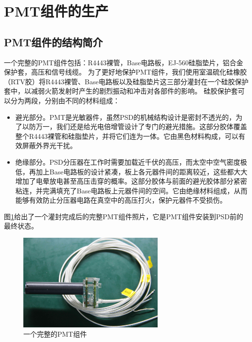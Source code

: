 \section{PMT组件的生产}
\label{sec:construction:pmt_production}

\subsection{PMT组件的结构简介}
\label{sec:construction:pmt_assembly}
一个完整的PMT组件包括：R4443裸管，Base电路板，EJ-560硅脂垫片，铝合金保护套，高压和信号线缆。
为了更好地保护PMT组件，我们使用室温硫化硅橡胶（RTV胶）将R4443裸管、Base电路板以及硅脂垫片这三部分灌封在一个硅胶保护套中，以减弱火箭发射时产生的剧烈振动和冲击对各部件的影响。
硅胶保护套可以分为两段，分别由不同的材料组成：
\begin{itemize}
	\item 避光部分。PMT是光敏器件，虽然PSD的机械结构设计是密封不透光的，为了以防万一，我们还是给光电倍增管设计了专门的避光措施。这部分胶体覆盖整个R4443裸管和硅脂垫片，并将它们连为一体。它由黑色材料构成，可以有效屏蔽外界光干扰。
	\item 绝缘部分。PSD分压器在工作时需要加载近千伏的高压，而太空中空气密度极低，再加上Base电路板的设计紧凑，板上各元器件间的距离较近，这些都大大增加了电晕放电甚至高压击穿的概率。这部分胶体与前面的避光胶体部分紧密粘连，并完满填充了Base电路板上元器件间的空间。它由绝缘材料组成，从而能够有效防止分压器电路在真空中的高压打火，保护元器件不受损伤。
\end{itemize}
图\ref{fig:construction:pmt_assembly}给出了一个灌封完成后的完整PMT组件照片，它是PMT组件安装到PSD前的最终状态。
\begin{figure}[htbp]
	\centering
	\includegraphics[width=0.65\textwidth]{chap/construction/fig/pmt_assembly.jpg}
	\caption{一个完整的PMT组件}
	\label{fig:construction:pmt_assembly}
\end{figure}

